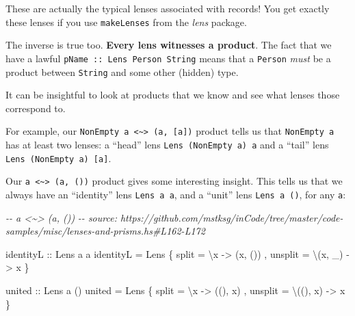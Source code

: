 \documentclass[]{article}
\newenvironment{Shaded}{}{}
\newcommand{\CommentTok}[1]{\textcolor[rgb]{0.38,0.63,0.69}{\textit{#1}}}
\newcommand{\DataTypeTok}[1]{\textcolor[rgb]{0.56,0.13,0.00}{#1}}
\newcommand{\NormalTok}[1]{#1}
\newcommand{\OtherTok}[1]{\textcolor[rgb]{0.00,0.44,0.13}{#1}}
\begin{document}
These are actually the typical lenses associated with records! You get exactly
these lenses if you use \texttt{makeLenses} from the \emph{lens} package.

The inverse is true too. \textbf{Every lens witnesses a product}. The fact that
we have a lawful \texttt{pName\ ::\ Lens\textquotesingle{}\ Person\ String}
means that a \texttt{Person} \emph{must} be a product between \texttt{String}
and some other (hidden) type.

It can be insightful to look at products that we know and see what lenses those
correspond to.

For example, our
\texttt{NonEmpty\ a\ \textless{}\textasciitilde{}\textgreater{}\ (a,\ {[}a{]})}
product tells us that \texttt{NonEmpty\ a} has at least two lenses: a ``head''
lens \texttt{Lens\textquotesingle{}\ (NonEmpty\ a)\ a} and a ``tail'' lens
\texttt{Lens\textquotesingle{}\ (NonEmpty\ a)\ {[}a{]}}.

Our \texttt{a\ \textless{}\textasciitilde{}\textgreater{}\ (a,\ ())} product
gives some interesting insight. This tells us that we always have an
``identity'' lens \texttt{Lens\textquotesingle{}\ a\ a}, and a ``unit'' lens
\texttt{Lens\textquotesingle{}\ a\ ()}, for any \texttt{a}:

\begin{Shaded}
\begin{Highlighting}[]
\CommentTok{{-}{-} a \textless{}\textasciitilde{}\textgreater{} (a, ())}
\CommentTok{{-}{-} source: https://github.com/mstksg/inCode/tree/master/code{-}samples/misc/lenses{-}and{-}prisms.hs\#L162{-}L172}

\OtherTok{identityL ::} \DataTypeTok{Lens\textquotesingle{}}\NormalTok{ a a}
\NormalTok{identityL }\OtherTok{=} \DataTypeTok{Lens\textquotesingle{}}
\NormalTok{    \{ split   }\OtherTok{=}\NormalTok{ \textbackslash{}x      }\OtherTok{{-}\textgreater{}}\NormalTok{ (x, ())}
\NormalTok{    , unsplit }\OtherTok{=}\NormalTok{ \textbackslash{}(x, \_) }\OtherTok{{-}\textgreater{}}\NormalTok{ x}
\NormalTok{    \}}

\OtherTok{united ::} \DataTypeTok{Lens\textquotesingle{}}\NormalTok{ a ()}
\NormalTok{united }\OtherTok{=} \DataTypeTok{Lens\textquotesingle{}}
\NormalTok{    \{ split   }\OtherTok{=}\NormalTok{ \textbackslash{}x       }\OtherTok{{-}\textgreater{}}\NormalTok{ ((), x)}
\NormalTok{    , unsplit }\OtherTok{=}\NormalTok{ \textbackslash{}((), x) }\OtherTok{{-}\textgreater{}}\NormalTok{ x}
\NormalTok{    \}}
\end{Highlighting}
\end{Shaded}
\end{document}
